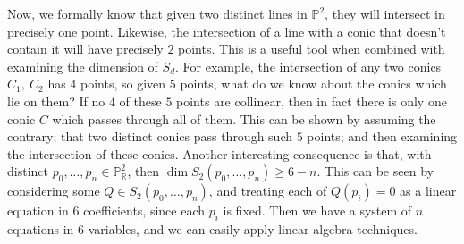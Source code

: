 Now, we formally know that given two distinct lines in $\mathbb{P}^2$, they will intersect in
precisely one point. Likewise, the intersection of a line with a conic that doesn't
contain it will have precisely $2$ points. This is a useful tool when combined with
examining the dimension of $S_d$. For example, the intersection of any two
conics $C_1,~C_2$ has $4$ points, so given $5$ points, what do
we know about the conics which lie on them? If no $4$ of these $5$ points
are collinear, then in fact there is only one conic $C$ which passes
through all of them. This can be shown by assuming the contrary;
that two distinct conics pass through such $5$ points; and then examining
the intersection of these conics. Another interesting consequence
is that, with distinct $p_0, \dots, p_n \in \mathbb{P}^2_\mathbb{R}$, then
$\dim S_2(p_0, \dots, p_n) \ge 6 - n$. This can be seen by considering
some $Q \in S_2(p_0, \dots, p_n)$, and treating each of $Q(p_i) = 0$ as
a linear equation in $6$ coefficients, since each $p_i$ is fixed. Then we 
have a system of $n$ equations in $6$ variables, and we can easily apply
linear algebra techniques.
